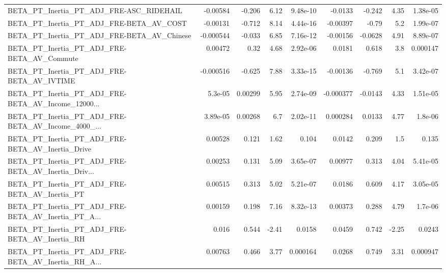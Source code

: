 \begin{tabular}{lrrrrrrrr}
BETA\_PT\_Inertia\_PT\_ADJ\_FRE-ASC\_RIDEHAIL            &    -0.00584 &       -0.206 &     6.12 & 9.48e-10 &    -0.0133 &      -0.242 &         4.35 &      1.38e-05 \\
BETA\_PT\_Inertia\_PT\_ADJ\_FRE-BETA\_AV\_COST            &    -0.00131 &       -0.712 &     8.14 & 4.44e-16 &   -0.00397 &       -0.79 &          5.2 &      1.99e-07 \\
BETA\_PT\_Inertia\_PT\_ADJ\_FRE-BETA\_AV\_Chinese         &   -0.000544 &       -0.033 &     6.85 & 7.16e-12 &   -0.00156 &     -0.0628 &         4.91 &      8.89e-07 \\
BETA\_PT\_Inertia\_PT\_ADJ\_FRE-BETA\_AV\_Commute         &     0.00472 &         0.32 &     4.68 & 2.92e-06 &     0.0181 &       0.618 &          3.8 &      0.000147 \\
BETA\_PT\_Inertia\_PT\_ADJ\_FRE-BETA\_AV\_IVTIME          &   -0.000516 &       -0.625 &     7.88 & 3.33e-15 &   -0.00136 &      -0.769 &          5.1 &      3.42e-07 \\
BETA\_PT\_Inertia\_PT\_ADJ\_FRE-BETA\_AV\_Income\_12000... &     5.3e-05 &      0.00299 &     5.95 & 2.74e-09 &  -0.000377 &     -0.0143 &         4.33 &      1.51e-05 \\
BETA\_PT\_Inertia\_PT\_ADJ\_FRE-BETA\_AV\_Income\_4000\_... &    3.89e-05 &      0.00268 &      6.7 & 2.02e-11 &   0.000284 &      0.0133 &         4.77 &       1.8e-06 \\
BETA\_PT\_Inertia\_PT\_ADJ\_FRE-BETA\_AV\_Inertia\_Drive   &     0.00528 &        0.121 &     1.62 &    0.104 &     0.0142 &       0.209 &          1.5 &         0.135 \\
BETA\_PT\_Inertia\_PT\_ADJ\_FRE-BETA\_AV\_Inertia\_Driv... &     0.00253 &        0.131 &     5.09 & 3.65e-07 &    0.00977 &       0.313 &         4.04 &      5.41e-05 \\
BETA\_PT\_Inertia\_PT\_ADJ\_FRE-BETA\_AV\_Inertia\_PT      &     0.00515 &        0.313 &     5.02 & 5.21e-07 &     0.0186 &       0.609 &         4.17 &      3.05e-05 \\
BETA\_PT\_Inertia\_PT\_ADJ\_FRE-BETA\_AV\_Inertia\_PT\_A... &     0.00159 &        0.198 &     7.16 & 8.32e-13 &    0.00373 &       0.288 &         4.79 &       1.7e-06 \\
BETA\_PT\_Inertia\_PT\_ADJ\_FRE-BETA\_AV\_Inertia\_RH      &       0.016 &        0.544 &    -2.41 &   0.0158 &     0.0459 &       0.742 &        -2.25 &        0.0243 \\
BETA\_PT\_Inertia\_PT\_ADJ\_FRE-BETA\_AV\_Inertia\_RH\_A... &     0.00763 &        0.466 &     3.77 & 0.000164 &     0.0268 &       0.749 &         3.31 &      0.000947 \\

\end{tabular}
